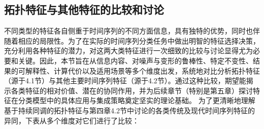 \subsection{拓扑特征与其他特征的比较和讨论}
不同类型的特征各自侧重于时间序列的不同方面信息，具有独特的优势，同时也伴随着相应的局限性。为了在实际的时间序列分类任务中做出明智的特征选择决策，充分利用各种特征的潜力，对这两大类特征进行一次细致的比较与讨论显得尤为必要和关键。因此，本节旨在从信息内容、对噪声与变形的鲁棒性、特定不变性、结果的可解释性、计算代价以及适用场景等多个维度出发，系统地对比分析拓扑特征（源于4.1节）与其他主要时间序列特征（源于4.2节）。通过这种比较，期望能揭示各类特征的相对价值、潜在的协同作用，并为后续章节（特别是第五章）探讨特征在分类模型中的具体应用与集成策略奠定坚实的理论基础。
为了更清晰地理解基于持续同调的拓扑特征与第四章4.2节中讨论的各类传统及现代时间序列特征的异同，下表从多个维度对它们进行了比较：

